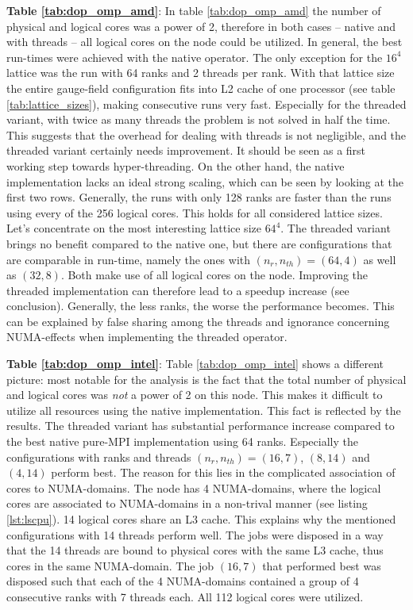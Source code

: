 \documentclass{article}
\theoremstyle{plain} %
\theoremstyle{convention} %
\theoremstyle{remark} %
\numberwithin{equation}{section}
\begin{document}
\textbf{Table \ref{tab:dop_omp_amd}}: In table \ref{tab:dop_omp_amd} the number of physical and logical cores was a power of \num{2}, therefore in both cases -- native and with threads -- all logical cores on the node could be utilized. In general, the best run-times were achieved with the native operator. The only exception for the $16^4$ lattice was the run with \num{64} ranks and \num{2} threads per rank. With that lattice size the entire gauge-field configuration fits into L2 cache of one processor (see table \ref{tab:lattice_sizes}), making consecutive runs very fast. Especially for the threaded variant, with twice as many threads the problem is not solved in half the time. This suggests that the overhead for dealing with threads is not negligible, and the threaded variant certainly needs improvement. It should be seen as a first working step towards hyper-threading. On the other hand, the native implementation lacks an ideal strong scaling, which can be seen by looking at the first two rows. Generally, the runs with only \num{128} ranks are faster than the runs using every of the \num{256} logical cores. This holds for all considered lattice sizes. Let's concentrate on the most interesting lattice size $64^4$. The threaded variant brings no benefit compared to the native one, but there are configurations that are comparable in run-time, namely the ones with $(n_r, n_{th})=(64,4)$ as well as $(32,8)$. Both make use of all logical cores on the node. Improving the threaded implementation can therefore lead to a speedup increase (see conclusion). Generally, the less ranks, the worse the performance becomes. This can be explained by false sharing among the threads and ignorance concerning NUMA-effects when implementing the threaded operator.

\textbf{Table \ref{tab:dop_omp_intel}}: Table \ref{tab:dop_omp_intel} shows a different picture: most notable for the analysis is the fact that the total number of physical and logical cores was \textit{not} a power of \num{2} on this node. This makes it difficult to utilize all resources using the native implementation. This fact is reflected by the results. The threaded variant has substantial performance increase compared to the best native pure-MPI implementation using \num{64} ranks. Especially the configurations with ranks and threads $(n_r, n_{th})=(16,7)$, $(8,14)$ and $(4,14)$ perform best. The reason for this lies in the complicated association of cores to NUMA-domains. The node has \num{4} NUMA-domains, where the logical cores are associated to NUMA-domains in a non-trival manner (see listing \ref{lst:lscpu}). \num{14} logical cores share an L3 cache. This explains why the mentioned configurations with \num{14} threads perform well. The jobs were disposed in a way that the \num{14} threads are bound to physical cores with the same L3 cache, thus cores in the same NUMA-domain. The job $(16,7)$ that performed best was disposed such that each of the \num{4} NUMA-domains contained a group of \num{4} consecutive ranks with \num{7} threads each. All \num{112} logical cores were utilized.
\end{document}
